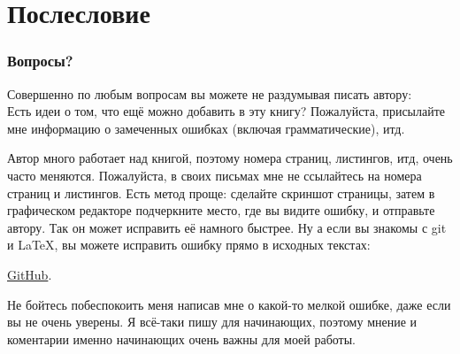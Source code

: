 \part*{Послесловие}

\section{Вопросы?}

Совершенно по любым вопросам вы можете не раздумывая писать автору: \\
\GTT{<\EMAIL>}
Есть идеи о том, что ещё можно добавить в эту книгу?
Пожалуйста, присылайте мне информацию о замеченных ошибках (включая грамматические), итд.

Автор много работает над книгой, поэтому номера страниц, листингов, итд, очень часто меняются.
Пожалуйста, в своих письмах мне не ссылайтесь на номера страниц и листингов.
Есть метод проще: сделайте скриншот страницы, затем в графическом редакторе подчеркните место, где вы видите
ошибку, и отправьте автору. Так он может исправить её намного быстрее.
Ну а если вы знакомы с git и \LaTeX, вы можете исправить ошибку прямо в исходных текстах:

\href{http://go.yurichev.com/17089}{GitHub}.

Не бойтесь побеспокоить меня написав мне о какой-то мелкой ошибке, даже если вы не очень уверены.
Я всё-таки пишу для начинающих, поэтому мнение и коментарии именно начинающих очень важны для моей работы.

